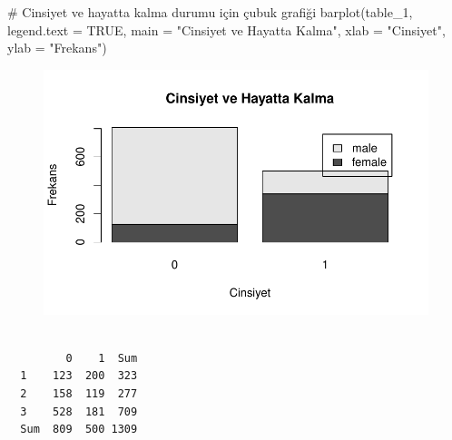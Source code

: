 \documentclass[
  letterpaper,
  DIV=11,
  numbers=noendperiod]{scrartcl}
\newenvironment{Shaded}{\begin{snugshade}}{\end{snugshade}}
\newcommand{\AttributeTok}[1]{\textcolor[rgb]{0.40,0.45,0.13}{#1}}
\newcommand{\CommentTok}[1]{\textcolor[rgb]{0.37,0.37,0.37}{#1}}
\newcommand{\ConstantTok}[1]{\textcolor[rgb]{0.56,0.35,0.01}{#1}}
\newcommand{\FunctionTok}[1]{\textcolor[rgb]{0.28,0.35,0.67}{#1}}
\newcommand{\NormalTok}[1]{\textcolor[rgb]{0.00,0.23,0.31}{#1}}
\newcommand{\OtherTok}[1]{\textcolor[rgb]{0.00,0.23,0.31}{#1}}
\newcommand{\SpecialCharTok}[1]{\textcolor[rgb]{0.37,0.37,0.37}{#1}}
\newcommand{\StringTok}[1]{\textcolor[rgb]{0.13,0.47,0.30}{#1}}
\begin{document}
\begin{Shaded}
\begin{Highlighting}[]
\CommentTok{\# Cinsiyet ve hayatta kalma durumu için çubuk grafiği}
\FunctionTok{barplot}\NormalTok{(table\_1, }\AttributeTok{legend.text =} \ConstantTok{TRUE}\NormalTok{, }\AttributeTok{main =} \StringTok{"Cinsiyet ve Hayatta Kalma"}\NormalTok{, }\AttributeTok{xlab =} \StringTok{"Cinsiyet"}\NormalTok{, }\AttributeTok{ylab =} \StringTok{"Frekans"}\NormalTok{)}
\end{Highlighting}
\end{Shaded}

\begin{figure}[H]

{\centering \includegraphics{4_hafta_tanimlayici_istatistik_files/figure-pdf/unnamed-chunk-6-3.pdf}

}

\end{figure}

\begin{Shaded}
\end{Shaded}

\begin{verbatim}
     
         0    1  Sum
  1    123  200  323
  2    158  119  277
  3    528  181  709
  Sum  809  500 1309
\end{verbatim}
\end{document}
